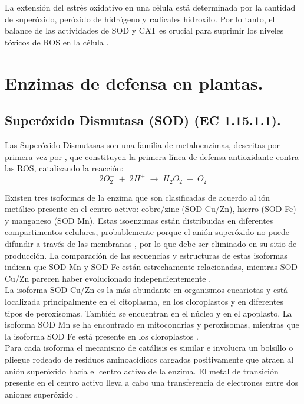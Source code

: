 La extensión del estrés oxidativo en una célula está determinada por la cantidad de superóxido, per\'oxido de hidr\'ogeno y radicales hidroxilo. Por lo tanto, el balance de las actividades de SOD y CAT es crucial para suprimir los niveles tóxicos de ROS en la célula \citep{benezer2008produccion}. \\

\section{Enzimas de defensa en plantas.}

\subsection{Super\'oxido Dismutasa (SOD) (EC 1.15.1.1).}

Las Superóxido Dismutasas son una familia de metaloenzimas, descritas por primera vez por \cite{mccord1969superoxide}, que constituyen la primera línea de defensa antioxidante contra las ROS, catalizando la reacci\'on:
$$2O_2^- \; + \; 2H^+ \; \longrightarrow \; H_2O_2 \; + \; O_2$$

Existen tres isoformas de la enzima que son clasificadas de acuerdo al i\'on met\'alico presente en el centro activo: cobre/zinc (SOD Cu/Zn), hierro (SOD Fe) y manganeso (SOD Mn). Estas isoenzimas est\'an distribuidas en diferentes compartimentos celulares, probablemente porque el ani\'on super\'oxido no puede difundir a trav\'es de las membranas \citep{takahashi1983superoxide}, por lo que debe ser eliminado en su sitio de producci\'on. La comparaci\'on de las secuencias y estructuras de estas isoformas indican que SOD Mn y SOD Fe están estrechamente relacionadas, mientras SOD Cu/Zn parecen haber evolucionado independientemente \citep{bowler1994superoxide}.\\

La isoforma SOD Cu/Zn es la más abundante en organismos eucariotas y está localizada principalmente en el citoplasma, en los cloroplastos y en diferentes tipos de peroxisomas. También se encuentran en el núcleo y en el apoplasto. La isoforma SOD Mn se ha encontrado en mitocondrias y peroxisomas, mientras que la isoforma SOD Fe está presente en los cloroplastos \citep{munoz2005crystal}.\\

Para cada isoforma el mecanismo de cat\'alisis es similar e involucra un bolsillo o pliegue rodeado de residuos aminoac\'idicos cargados positivamente que atraen al ani\'on super\'oxido hacia el centro activo de la enzima. El metal de transici\'on presente en el centro activo lleva a cabo una transferencia de electrones entre dos aniones super\'oxido \citep{bowler1994superoxide}. \\

